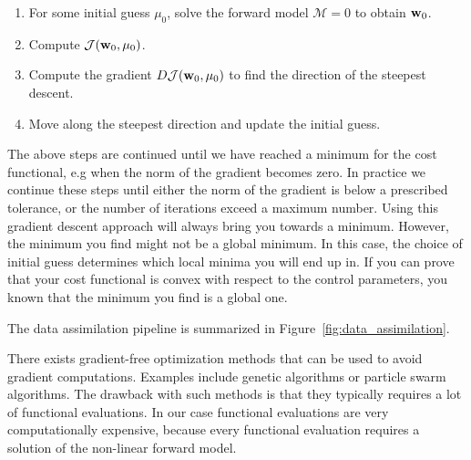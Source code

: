 \begin{enumerate}
  \item For some initial guess $\mu_0$, solve the forward model
    $\mathcal{M} = 0$ to obtain $\mathbf{w}_0$.
  \item Compute $\mathcal{J}(\mathbf{w}_0, \mu_0)$.
  \item Compute the gradient $D \mathcal{J}(\mathbf{w}_0, \mu_0)$ to find
    the direction of the steepest descent.
  \item Move along the steepest direction and update the initial
    guess.
\end{enumerate}
The above steps are continued until we have reached a minimum for the
cost functional, e.g when the norm of the gradient becomes zero. In
practice we continue these steps until either the norm of the
gradient is below a prescribed tolerance, or the number of iterations
exceed a maximum number. Using this gradient descent approach will
always bring you towards a minimum. However, the minimum you find
might not be a global minimum. In this case, the choice of initial
guess determines which local minima you will end up in. If you can
prove that your cost functional is convex with respect to the control
parameters, you known that the minimum you find is a global
one.

The data assimilation pipeline is summarized in
Figure~\ref{fig:data_assimilation}. 

\begin{remark}
  There exists gradient-free optimization methods that can be used to
  avoid gradient computations. Examples include genetic algorithms or
  particle swarm algorithms. The drawback with such methods is that
  they typically requires a lot of functional evaluations. In our
  case functional evaluations are very computationally expensive,
  because every functional evaluation requires a solution of the
  non-linear forward model.  
\end{remark}


